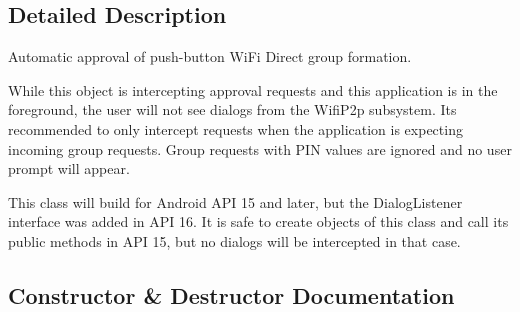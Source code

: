 \subsection{Detailed Description}
Automatic approval of push-\/button Wi\+Fi Direct group formation.

While this object is intercepting approval requests and this application is in the foreground, the user will not see dialogs from the Wifi\+P2p subsystem. It\textquotesingle{}s recommended to only intercept requests when the application is expecting incoming group requests. Group requests with P\+I\+N values are ignored and no user prompt will appear.

This class will build for Android A\+P\+I 15 and later, but the Dialog\+Listener interface was added in A\+P\+I 16. It is safe to create objects of this class and call its public methods in A\+P\+I 15, but no dialogs will be intercepted in that case. 

\subsection{Constructor \& Destructor Documentation}
\hypertarget{classcom_1_1copelabs_1_1oiframework_1_1wifi_1_1_wifi_direct_auto_accept_a3a1201c7b26eb0181c15053378aabb79}{}
